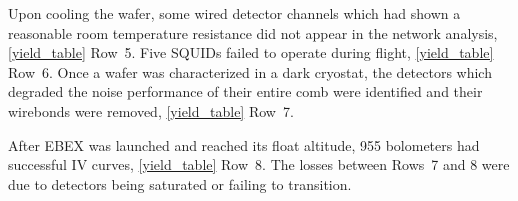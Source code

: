 Upon cooling the wafer, some wired detector channels which had shown a reasonable room temperature resistance did not appear in the network analysis, \TAB\ref{yield_table} Row~5. 
Five \ac{SQUID}s failed to operate during flight, \TAB\ref{yield_table} Row~6. 
Once a wafer was characterized in a dark cryostat, the detectors which degraded the noise performance of their entire comb were identified and their wirebonds were removed, \TAB\ref{yield_table} Row~7. 

After \ac{EBEX} was launched and reached its float altitude, 955 bolometers had successful IV curves, \TAB\ref{yield_table} Row~8. 
The losses between Rows~7 and 8 were due to detectors being saturated or failing to transition. 

%
%
